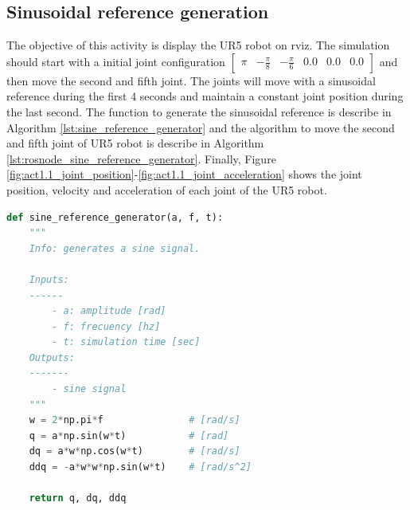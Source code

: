 \subsection{Sinusoidal reference generation}
The objective of this activity is display the UR5 robot on rviz. The simulation should start with a initial joint configuration $\begin{bmatrix} \pi & -\frac{\pi}{8} & -\frac{\pi}{6} & 0.0 & 0.0 & 0.0 \end{bmatrix}$ and then move the second and fifth joint. The joints will move with a sinusoidal reference during the first 4 seconds and maintain a constant joint position during the last second. The function to generate the sinusoidal reference is describe in Algorithm \ref{lst:sine_reference_generator} and the algorithm to move the second and fifth joint of UR5 robot is describe in Algorithm \ref{lst:rosnode_sine_reference_generator}. Finally, Figure \ref{fig:act1.1_joint_position}-\ref{fig:act1.1_joint_acceleration} shows the joint position, velocity and acceleration of each joint of the UR5 robot.

\begin{lstlisting}[language=Python,caption=Function to generate sinusoidal reference., label={lst:sine_reference_generator}]
def sine_reference_generator(a, f, t):
    """
    Info: generates a sine signal.

    Inputs: 
    ------
        - a: amplitude [rad]
        - f: frecuency [hz]
        - t: simulation time [sec]
    Outputs:
    -------
        - sine signal
    """
    w = 2*np.pi*f               # [rad/s]
    q = a*np.sin(w*t)           # [rad]
    dq = a*w*np.cos(w*t)        # [rad/s]
    ddq = -a*w*w*np.sin(w*t)    # [rad/s^2]

    return q, dq, ddq
\end{lstlisting}

